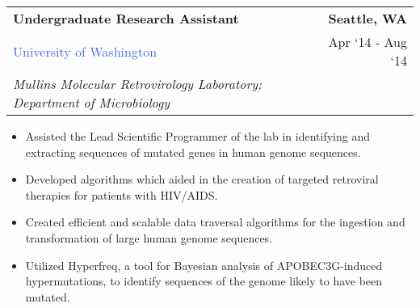 \documentclass[10pt]{article}
\newcommand{\highlightcolor}{RoyalBlue}
\newcommand{\tabularxwidth}{\textwidth}
\begin{document}
    \begin{minipage}{\tabularxwidth}

        \begin{tabularx}{\tabularxwidth}{X r}
            \textbf{Undergraduate Research Assistant} & \textbf{Seattle, 
        WA} \\
            
    
    
    

    
        \textcolor{\highlightcolor}{University of Washington} & 
        
    Apr ‘14 - 
    Aug ‘14 \\
        
            \textit{Mullins Molecular Retrovirology Laboratory;}
                \textit{Department of Microbiology} & \\
        
    
            
        \end{tabularx}

        \begin{itemize}[noitemsep, topsep=3pt, parsep=0pt, partopsep=0pt]
            
                \item 
    Assisted the Lead Scientific Programmer of the lab in identifying and extracting sequences of mutated genes in human genome sequences.
            
                \item 
    Developed algorithms which aided in the creation of targeted retroviral therapies for patients with HIV/AIDS.
            
                \item 
    Created efficient and scalable data traversal algorithms for the ingestion and transformation of large human genome sequences.
            
                \item 
    Utilized Hyperfreq, a tool for Bayesian analysis of APOBEC3G-induced hypermutations, to identify sequences of the genome likely to have been mutated.
            
        \end{itemize}

        

    \end{minipage}
    
\end{document}
